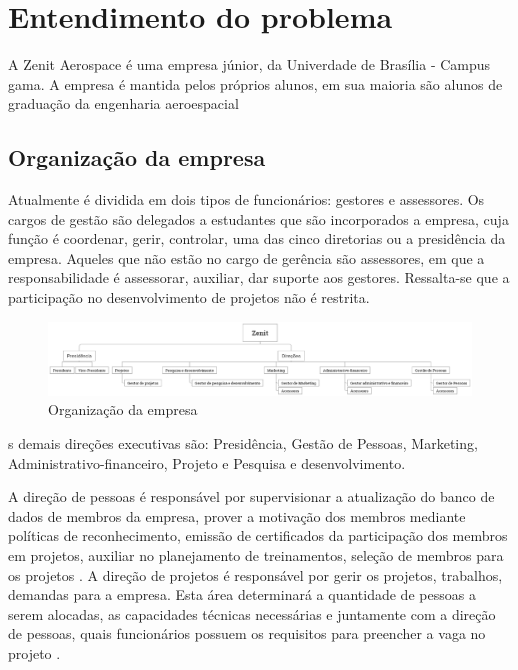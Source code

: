 \section{Entendimento do problema}
A Zenit Aerospace é uma empresa júnior, da Univerdade de Brasília - Campus gama. A empresa é mantida pelos próprios alunos, em sua maioria são alunos de graduação da engenharia aeroespacial

\subsection{Organização da empresa}
Atualmente é dividida em dois tipos de funcionários: gestores e assessores. Os cargos de gestão são delegados a estudantes que são incorporados a empresa, cuja função é coordenar, gerir, controlar, uma das cinco diretorias ou a presidência da empresa. Aqueles que não estão no cargo de gerência são assessores, em que a responsabilidade é assessorar, auxiliar, dar suporte aos gestores. Ressalta-se que a participação no desenvolvimento de projetos não é restrita.

\begin{figure}[H]
    \centering
    \label{organizacaoZenit}
    \includegraphics[keepaspectratio=true,scale=0.3]{figuras/zenitOrganograma.eps}
    \caption[Organização da empresa]{Organização da empresa}
\end{figure}

s demais direções executivas são: Presidência, Gestão de Pessoas, Marketing, Administrativo-financeiro, Projeto e Pesquisa e desenvolvimento. 

A direção de pessoas é responsável por supervisionar a atualização do banco de dados de membros da empresa, prover a motivação dos membros mediante políticas de reconhecimento, emissão de certificados da participação dos membros em projetos, auxiliar no planejamento de treinamentos, seleção de membros para os projetos \cite{regimentoInternoZenit}.
A direção de projetos é responsável por gerir os projetos, trabalhos, demandas para a empresa. Esta área determinará a quantidade de pessoas a serem alocadas, as capacidades técnicas necessárias e juntamente com a direção de pessoas, quais funcionários possuem os requisitos para preencher a vaga no projeto \cite{regimentoInternoZenit}.

